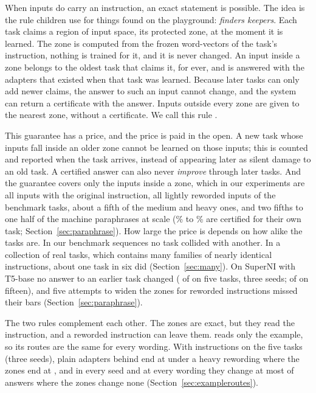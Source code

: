 When inputs do carry an instruction, an exact statement is possible. The idea is the rule children
use for things found on the playground: \emph{finders keepers}. Each task claims a region of input
space, its protected zone, at the moment it is learned. The zone is computed from the frozen
word-vectors of the task's instruction, nothing is trained for it, and it is never changed. An input
inside a zone belongs to the oldest task that claims it, for ever, and is answered with the adapters
that existed when that task was learned. Because later tasks can only add newer claims, the answer
to such an input cannot change, and the system can return a certificate with the answer. Inputs
outside every zone are given to the nearest zone, without a certificate. We call this rule \cert{}.

This guarantee has a price, and the price is paid in the open. A new task whose inputs fall inside
an older zone cannot be learned on those inputs; this is counted and reported when the task
arrives, instead of appearing later as silent damage to an old task. A certified answer can also
never \emph{improve} through later tasks. And the guarantee covers only the inputs inside a zone,
which in our experiments are all inputs with the original instruction, all lightly reworded inputs of the benchmark tasks, about a fifth of the medium and heavy ones, and two fifths to one half of the machine paraphrases at scale (\WidenRefTfivePLow{}\% to \WidenRefTfivePHigh{}\% are certified for their own task; Section~\ref{sec:paraphrase}). How large the price is depends on how alike the tasks are. In our benchmark sequences no
task collided with another. In a collection of \ManyTasks{} real tasks, which contains many
families of nearly identical instructions, about one task in six did (Section~\ref{sec:many}). On
SuperNI with T5-base no answer to an earlier task changed (\FiveCertChanged{} of \FiveCertCompared{}
on five tasks, three seeds; \FifteenCertChanged{} of \FifteenCertCompared{} on fifteen), and five
attempts to widen the zones for reworded instructions missed their bars
(Section~\ref{sec:paraphrase}).

The two rules complement each other. The zones are exact, but they read the instruction, and a
reworded instruction can leave them. \recog{} reads only the example, so its routes are the same
for every wording. With instructions on the five tasks (three seeds), plain adapters behind
\recog{} end at \AudUThreeHeavyRidgeAPOne{} under a heavy rewording where the zones end at
\AudUThreeHeavyCertAPOne{}, and in every seed and at every wording they change at most \AudUThreeMaxChangedPerSeed{} of
\AudUCompared{} answers where the zones change none (Section~\ref{sec:exampleroutes}).


